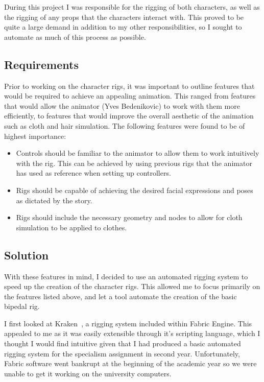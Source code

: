\documentclass[11pt]{article}
\begin{document}
During this project I was responsible for the rigging of both characters, as well as the rigging of any props that the characters interact with. This proved to be quite a large demand in addition to my other responsibilities, so I sought to automate as much of this process as possible.

\subsection{Requirements}

Prior to working on the character rigs, it was important to outline features that would be required to achieve an appealing animation. This ranged from features that would allow the animator (Yves Bedenikovic) to work with them more efficiently, to features that would improve the overall aesthetic of the animation such as cloth and hair simulation. The following features were found to be of highest importance:

\begin{itemize}

\item Controls should be familiar to the animator to allow them to work intuitively with the rig. This can be achieved by using previous rigs that the animator has used as reference when setting up controllers.

\item Rigs should be capable of achieving the desired facial expressions and poses as dictated by the story.

\item Rigs should include the necessary geometry and nodes to allow for cloth simulation to be applied to clothes.

\end{itemize}

\subsection{Solution}

With these features in mind, I decided to use an automated rigging system to speed up the creation of the character rigs. This allowed me to focus primarily on the features listed above, and let a tool automate the creation of the basic bipedal rig.

I first looked at Kraken~\cite{kraken}, a rigging system included within Fabric Engine. This appealed to me as it was easily extensible through it's scripting language, which I thought I would find intuitive given that I had produced a basic automated rigging system for the specialism assignment in second year. Unfortunately, Fabric software went bankrupt at the beginning of the academic year so we were unable to get it working on the university computers.
\end{document}
